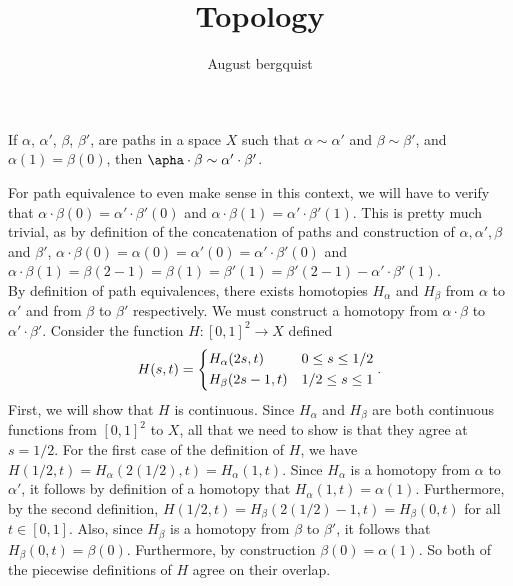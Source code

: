 \documentclass{article}
\title{Topology}
\author{August bergquist}
\begin{document}
\maketitle

 If $\alpha$, $\alpha'$, $\beta$, $\beta'$, are paths in a space $X$ such that $\alpha\sim \alpha'$ and $\beta\sim \beta'$, and $\alpha(1) = \beta(0)$, then $\apha\cdot\beta \sim \alpha'\cdot\beta'$.\\


For path equivalence to even make sense in this context, we will have to verify that $\alpha\cdot\beta(0) = \alpha'\cdot\beta'(0)$ and $\alpha\cdot\beta(1) = \alpha'\cdot\beta'(1)$. This is pretty much trivial, as by definition of the concatenation of paths and construction of $\alpha,\alpha',\beta$ and $\beta'$, $\alpha\cdot\beta(0) = \alpha(0) = \alpha'(0) = \alpha'\cdot\beta'(0)$ and $\alpha\cdot\beta(1) = \beta(2-1) = \beta(1) = \beta'(1) = \beta'(2-1) - \alpha'\cdot\beta'(1)$. \\

By definition of path equivalences, there exists homotopies $H_\alpha$ and $H_\beta$ from $\alpha$ to $\alpha'$ and from $\beta$ to $\beta'$ respectively. We must construct a homotopy from $\alpha\cdot\beta$ to $\alpha'\cdot\beta'$. Consider the function $H:[0,1]^2\rightarrow X$ defined
$$
    H(s,t) = \begin{dcases}
    H_\alpha(2s,t) & 0\le s \le 1/2\\
    H_\beta(2s-1,t) & 1/2 \le s \le 1
    \end{dcases}.
$$
First, we will show that $H$ is continuous. Since $H_\alpha$ and $H_\beta$ are both continuous functions from $[0,1]^2$ to $X$, all that we need to show is that they agree at $s = 1/2$. For the first case of the definition of $H$, we have $H(1/2,t) = H_\alpha(2(1/2),t) = H_\alpha(1,t)$. Since $H_\alpha$ is a homotopy from $\alpha$ to $\alpha'$, it follows by definition of a homotopy that $H_\alpha(1,t) = \alpha(1)$. Furthermore, by the second definition, $H(1/2,t) = H_\beta(2(1/2) - 1,t) = H_\beta(0,t)$ for all $t\in [0,1]$. Also, since $H_\beta$ is a homotopy from $\beta$ to $\beta'$, it follows that $H_\beta(0,t) = \beta(0)$. Furthermore, by construction $\beta(0) = \alpha(1)$. So both of the piecewise definitions of $H$ agree on their overlap.\\
\end{document}
